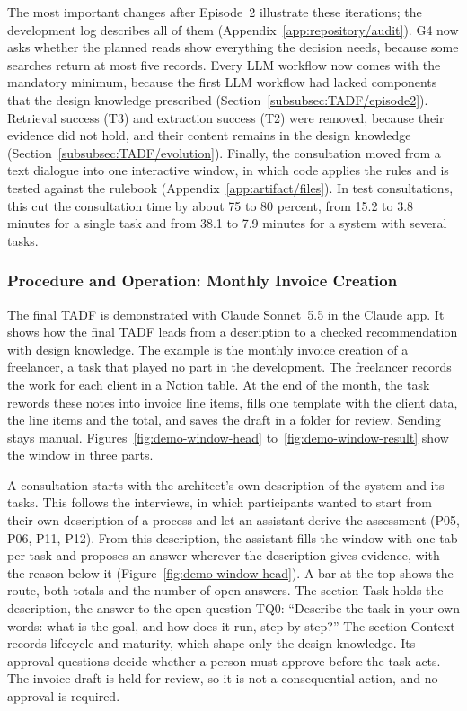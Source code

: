 The most important changes after Episode~2 illustrate these iterations; the development log describes all of them (Appendix~\ref{app:repository/audit}). G4 now asks whether the planned reads show everything the decision needs, because some searches return at most five records. Every LLM workflow now comes with the mandatory minimum, because the first LLM workflow had lacked components that the design knowledge prescribed (Section~\ref{subsubsec:TADF/episode2}). Retrieval success (T3) and extraction success (T2) were removed, because their evidence did not hold, and their content remains in the design knowledge (Section~\ref{subsubsec:TADF/evolution}). Finally, the consultation moved from a text dialogue into one interactive window, in which code applies the rules and is tested against the rulebook (Appendix~\ref{app:artifact/files}). In test consultations, this cut the consultation time by about 75 to 80 percent, from 15.2 to 3.8 minutes for a single task and from 38.1 to 7.9 minutes for a system with several tasks.

\subsubsection{Procedure and Operation: Monthly Invoice Creation}
\label{subsubsec:TADF/artifact-procedure}
\label{subsec:TADF/demonstration}
\label{subsubsec:TADF/demonstration-run}

The final TADF is demonstrated with Claude Sonnet~5.5 in the Claude app. It shows how the final TADF leads from a description to a checked recommendation with design knowledge. The example is the monthly invoice creation of a freelancer, a task that played no part in the development. The freelancer records the work for each client in a Notion table. At the end of the month, the task rewords these notes into invoice line items, fills one template with the client data, the line items and the total, and saves the draft in a folder for review. Sending stays manual. Figures~\ref{fig:demo-window-head} to~\ref{fig:demo-window-result} show the window in three parts.

A consultation starts with the architect's own description of the system and its tasks. This follows the interviews, in which participants wanted to start from their own description of a process and let an assistant derive the assessment (P05, P06, P11, P12). From this description, the assistant fills the window with one tab per task and proposes an answer wherever the description gives evidence, with the reason below it (Figure~\ref{fig:demo-window-head}). A bar at the top shows the route, both totals and the number of open answers. The section Task holds the description, the answer to the open question TQ0: ``Describe the task in your own words: what is the goal, and how does it run, step by step?'' The section Context records lifecycle and maturity, which shape only the design knowledge. Its approval questions decide whether a person must approve before the task acts. The invoice draft is held for review, so it is not a consequential action, and no approval is required.

